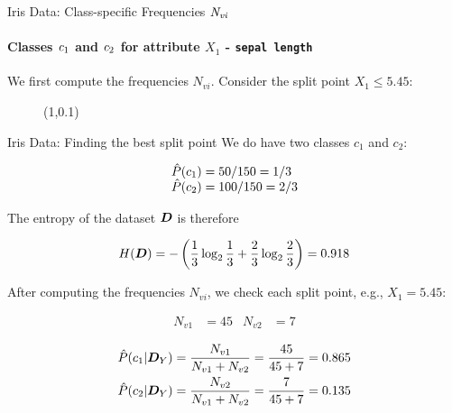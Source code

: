 \begin{frame}{Iris Data: Class-specific Frequencies ${\it N}_{{\it
  vi}}$}
  \framesubtitle{Classes ${\it c}_1$ and ${\it c}_2$ for 
  attribute $X_1$ - {\tt sepal length}}

We f\/{i}rst compute the frequencies $N_{vi}$.
Consider the split point $X_1 \le 5.45$: 

\begin{figure}[!t]
    \centering
    \hspace{0.4in}
    \pstScalePoints(1,0.1){}{}
\end{figure}
\end{frame}

\begin{frame}{Iris Data: Finding the best split point}
We do have two classes $c_1$ and $c_2$:

    \begin{align*}
    \hat{P}(c_1) & = {50}/{150}={1}/{3}\\[-5pt]
    \hat{P}(c_2) & = {100}/{150}={2}/{3}
    \end{align*}

    The entropy of the dataset ${\boldsymbol D}$ is therefore

    \begin{align*}
        H({\boldsymbol D}) = -\left({1 \over 3} \log_2 {1\over 3} +
            {2 \over 3} \log_2 {2\over 3}\right) = 0.918
    \end{align*}

	After computing the frequencies $N_{vi}$, we check each split point, e.g., $X_1=5.45$:

    \begin{align*}
      N_{v1} & = 45 & N_{v2} & = 7
    \end{align*}

    \begin{align*}
      \hat{P}(c_1|{\boldsymbol D}_Y) & = {N_{v1} \over N_{v1} + N_{v2}} =
        {45 \over 45+7} = 0.865\\
        \hat{P}(c_2|{\boldsymbol D}_Y) & = {N_{v2} \over N_{v1} + N_{v2}}
        = {7 \over 45+7} = 0.135
    \end{align*}

\end{frame}

